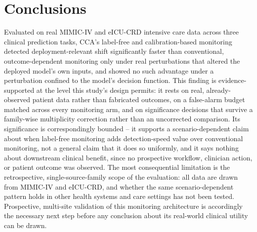 \documentclass[apajournal,article,submit,oneauthor]{Definitions/mdpi}
\begin{document}
\section{Conclusions}

Evaluated on real MIMIC-IV and eICU-CRD intensive care data across three clinical prediction tasks, CCA's label-free and calibration-based monitoring detected deployment-relevant shift significantly faster than conventional, outcome-dependent monitoring only under real perturbations that altered the deployed model's own inputs, and showed no such advantage under a perturbation confined to the model's decision function. This finding is evidence-supported at the level this study's design permits: it rests on real, already-observed patient data rather than fabricated outcomes, on a false-alarm budget matched across every monitoring arm, and on significance decisions that survive a family-wise multiplicity correction rather than an uncorrected comparison. Its significance is correspondingly bounded -- it supports a scenario-dependent claim about when label-free monitoring adds detection-speed value over conventional monitoring, not a general claim that it does so uniformly, and it says nothing about downstream clinical benefit, since no prospective workflow, clinician action, or patient outcome was observed. The most consequential limitation is the retrospective, single-source-family scope of the evaluation: all data are drawn from MIMIC-IV and eICU-CRD, and whether the same scenario-dependent pattern holds in other health systems and care settings has not been tested. Prospective, multi-site validation of this monitoring architecture is accordingly the necessary next step before any conclusion about its real-world clinical utility can be drawn.

\vspace{6pt}



\end{document}

